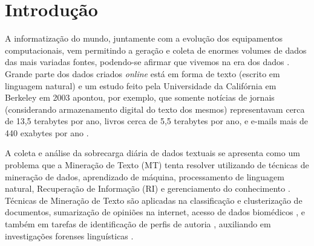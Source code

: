 \chapter{Introdução} \label{ch:Introdução}
    A informatização do mundo, juntamente com a evolução dos equipamentos computacionais, vem permitindo a geração e coleta de enormes volumes de dados das mais variadas fontes, podendo-se afirmar que vivemos na era dos dados \cite[p.~1]{Han:2011:DMC:1972541}.
    Grande parte dos dados criados \textit{online} está em forma de texto (escrito em linguagem natural) e um estudo feito pela Universidade da Califórnia em Berkeley em 2003 apontou, por exemplo, que somente notícias de jornais (considerando armazenamento digital do texto dos mesmos) representavam cerca de 13,5 terabytes por ano, livros cerca de 5,5 terabytes por ano, e e-mails mais de 440 exabytes por ano \cite{lyman2003much} \cite[p.~3]{Zhai2016TDMA}.
    
    A coleta e análise da sobrecarga diária de dados textuais se apresenta como um problema que a Mineração de Texto (MT) tenta resolver utilizando de técnicas de mineração de dados, aprendizado de máquina, processamento de linguagem natural, Recuperação de Informação (RI) e gerenciamento do conhecimento \cite[p.~1]{Han:2011:DMC:1972541} \cite{Feldman:2006:TMH:1076381} \cite[p.~1241]{Sammut2017EMLDM}.
    Técnicas de Mineração de Texto são aplicadas na classificação e clusterização de documentos, sumarização de opiniões na internet, acesso de dados biomédicos \cite[p.~4--8]{Aggarwal_MTD_2012},
    e também em tarefas de identificação de perfis de autoria\footnotemark{} \cite[p.~906]{rangel2014overview} \cite[p.~6--7]{rangel2018overview}, auxiliando em investigações forenses linguísticas \cite{Chaski_Author_2012}. 
    
    
